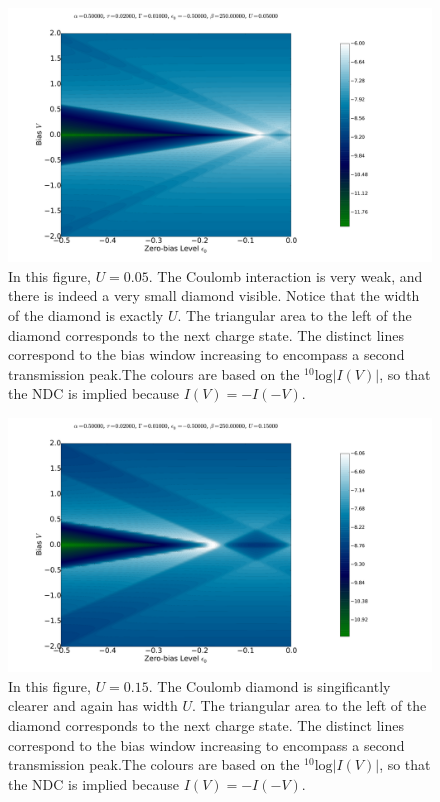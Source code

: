 \begin{figure}[h]
    \centering
    \includegraphics[height=.38\textheight]{pdf/coulombd/current_map_u1.pdf}
    \caption{In this figure, $U=0.05$. The Coulomb interaction is very weak, and there is indeed a very small diamond visible. Notice that the width of the diamond is exactly $U$. The triangular area to the left of the diamond corresponds to the next charge state. The distinct lines correspond to the bias window increasing to encompass a second transmission peak.The colours are based on the $^{10}\text{log}\left|I(V)\right|$, so that the NDC is implied because $I(V) = -I(-V)$.}
    \label{fig:currentmap1}
\end{figure}
\begin{figure}[h]
    \centering
    \includegraphics[height=.38\textheight]{pdf/coulombd/current_map_u2.pdf}
    \caption{In this figure, $U=0.15$. The Coulomb diamond is singificantly clearer and again has width $U$. The triangular area to the left of the diamond corresponds to the next charge state. The distinct lines correspond to the bias window increasing to encompass a second transmission peak.The colours are based on the $^{10}\text{log}\left|I(V)\right|$, so that the NDC is implied because $I(V) = -I(-V)$.}
    \label{fig:currentmap2}
\end{figure}
